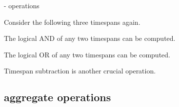 \begin{comment}
<abjad>
timespan_1.is_congruent_to_timespan(timespan_2)
timespan_1.is_congruent_to_timespan(timespan_1)
</abjad>
\end{comment}

\begin{comment}
<abjad>
timespan_1.is_tangent_to_timespan(timespan_2)
timespan_1.is_tangent_to_timespan(timespan_3)
</abjad>
\end{comment}

- operations

Consider the following three timespans again.

\begin{comment}
<abjad>
timespan_1 = timespantools.Timespan(0, 10)
timespan_2 = timespantools.Timespan(5, 15)
timespan_3 = timespantools.Timespan(10, 15)
</abjad>
\end{comment}

The logical AND of any two timespans can be computed.

\begin{comment}
<abjad>
timespan_1 & timespan_2
timespan_1 & timespan_3
timespan_2 & timespan_3
</abjad>
\end{comment}

The logical OR of any two timespans can be computed.

\begin{comment}
<abjad>
timespan_1 | timespan_2
timespan_1 | timespan_3
timespan_2 | timespan_3
</abjad>
\end{comment}

Timespan subtraction is another crucial operation.

\begin{comment}
<abjad>
timespan_1 = timespantools.Timespan(0, 10)
timespan_2 = timespantools.Timespan(2, 5)
timespan_3 = timespantools.Timespan(5, 12)
</abjad>
\end{comment}

\begin{comment}
<abjad>
print(format(timespan_1 - timespan_1))
print(format(timespan_1 - timespan_2))
print(format(timespan_1 - timespan_3))
print(format(timespan_2 - timespan_1))
print(format(timespan_2 - timespan_2))
print(format(timespan_2 - timespan_3))
print(format(timespan_3 - timespan_1))
print(format(timespan_3 - timespan_2))
print(format(timespan_3 - timespan_3))
</abjad>
\end{comment}

\subsection{aggregate operations}

